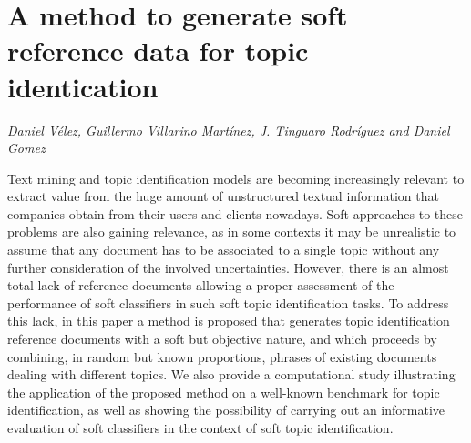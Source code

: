 \documentclass[../booklet.tex]{subfiles}
\begin{document}
\section[A method to generate soft reference data for topic identication. {\it Daniel Vélez, Guillermo Villarino Martínez, J. Tinguaro Rodríguez and Daniel Gomez}]{A method to generate soft reference data for topic identication}
   

\begin{center}
  {\it Daniel Vélez, Guillermo Villarino Martínez, J. Tinguaro Rodríguez and Daniel Gomez}
\end{center}

\vskip 0.8cm


Text mining and topic identification models are becoming increasingly relevant to extract value from the huge amount of unstructured textual information that companies obtain from their users and clients nowadays. Soft approaches to these problems are also gaining relevance, as in some contexts it may be unrealistic to assume that any document has to be associated to a single topic without any further consideration of the involved uncertainties. However, there is an almost total lack of reference documents allowing a proper assessment of the performance of soft classifiers in such soft topic identification tasks. To address this lack, in this paper a method is proposed that generates topic identification reference documents with a soft but objective nature, and which proceeds by combining, in random but known proportions, phrases of existing documents dealing with different topics. We also provide a computational study illustrating the application of the proposed method on a well-known benchmark for topic identification, as well as showing the possibility of carrying out an informative evaluation of soft classifiers in the context of soft topic identification.

\end{document}
